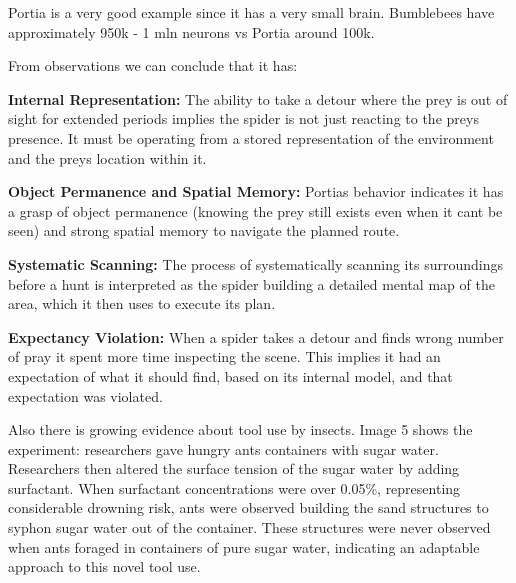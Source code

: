 Portia is a very good example since it has a very small brain. Bumblebees have approximately 950k - 1 mln neurons vs Portia around 100k.

From observations we can conclude that it has:

\textbf{Internal Representation:} The ability to take a detour where the prey is out of sight for extended periods implies the spider is not just reacting to the prey\textquotesingle s presence. It must be operating from a stored representation of the environment and the prey\textquotesingle s location within it.

\textbf{Object Permanence and Spatial Memory:} Portia\textquotesingle s behavior indicates it has a grasp of object permanence (knowing the prey still exists even when it can\textquotesingle t be seen) and strong spatial memory to navigate the planned route.

\textbf{Systematic Scanning:} The process of systematically scanning its surroundings before a hunt is interpreted as the spider building a detailed mental map of the area, which it then uses to execute its plan.

\textbf{Expectancy Violation:} When a spider takes a detour and finds wrong number of pray it spent more time inspecting the scene. This implies it had an expectation of what it should find, based on its internal model, and that expectation was violated.

Also there is growing evidence about tool use by insects. Image 5 shows the experiment: researchers gave hungry ants containers with sugar water. Researchers then altered the surface tension of the sugar water by adding surfactant. When surfactant concentrations were over 0.05\%, representing considerable drowning risk, ants were observed building the sand structures to syphon sugar water out of the container. These structures were never observed when ants foraged in containers of pure sugar water, indicating an adaptable approach to this novel tool use.

